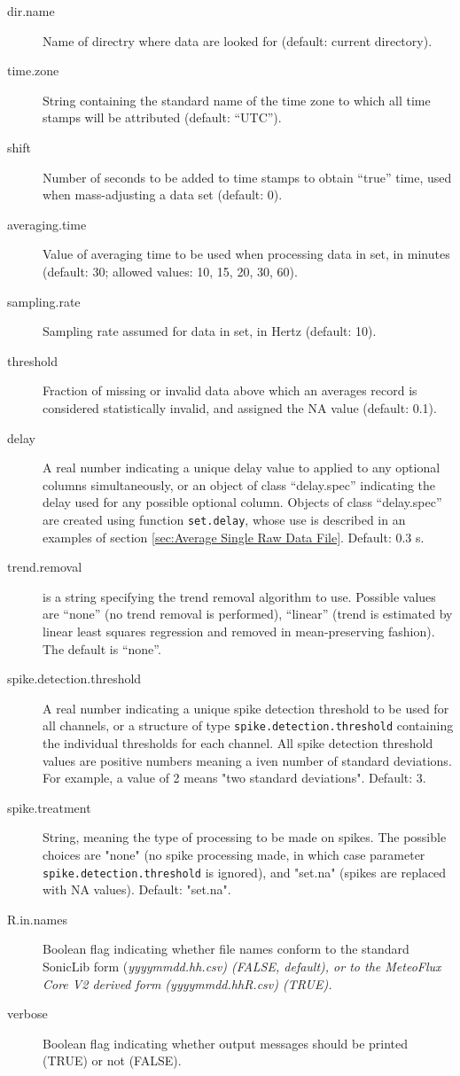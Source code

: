 \documentclass[a4paper,10pt]{book}
\begin{document}
\begin{description}
 \item[dir.name] Name of directry where data are looked for (default: current directory).
 \item[time.zone] String containing the standard name of the time zone to which all time stamps will be attributed (default: ``UTC''). 
 \item[shift] Number of seconds to be added to time stamps to obtain ``true'' time, used when mass-adjusting a data set (default: 0).
 \item[averaging.time] Value of averaging time to be used when processing data in set, in minutes (default: 30; allowed values: 10, 15, 20, 30, 60).
 \item[sampling.rate] Sampling rate assumed for data in set, in Hertz (default: 10).
 \item[threshold] Fraction of missing or invalid data above which an averages record is considered statistically invalid, and assigned the NA value (default: 0.1).
 \item[delay] A real number indicating a unique delay value to applied to any optional columns simultaneously, or an object of class ``delay.spec'' indicating the delay used for any possible optional column. Objects of class ``delay.spec'' are created using function \verb|set.delay|, whose use is described in an examples of section \ref{sec:Average Single Raw Data File}. Default: 0.3 s.
 \item[trend.removal] is a string specifying the trend removal algorithm to use. Possible values are ``none'' (no trend removal is performed), ``linear'' (trend is estimated by linear least squares regression and removed in mean-preserving fashion). The default is ``none''.
 \item[spike.detection.threshold] A real number indicating a unique spike detection threshold to be used for all channels, or a structure of type \verb|spike.detection.threshold| containing the individual thresholds for each channel. All spike detection threshold values are positive numbers meaning a iven number of standard deviations. For example, a value of 2 means "two standard deviations". Default: 3.
 \item[spike.treatment] String, meaning the type of processing to be made on spikes. The possible choices are "none" (no spike processing made, in which case parameter \verb|spike.detection.threshold| is ignored), and "set.na" (spikes are replaced with NA values). Default: "set.na".
 \item[R.in.names] Boolean flag indicating whether file names conform to the standard SonicLib form (\em{yyyymmdd.hh}.csv) (FALSE, default), or to the MeteoFlux Core V2 derived form (\em{yyyymmdd.hh}R.csv) (TRUE).
 \item[verbose] Boolean flag indicating whether output messages should be printed (TRUE) or not (FALSE).
\end{description}
\end{document}
